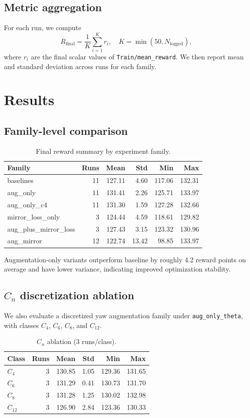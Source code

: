 \documentclass[conference]{IEEEtran}
\begin{document}
\subsection{Metric aggregation}
For each run, we compute
\begin{equation}
R_{\mathrm{final}} = \frac{1}{K}\sum_{i=1}^{K} r_i, \quad K=\min(50, N_{\mathrm{logged}}),
\end{equation}
where $r_i$ are the final scalar values of \texttt{Train/mean\_reward}. We then report mean and standard deviation across runs for each family.

\section{Results}
\subsection{Family-level comparison}
\begin{table}[t]
\caption{Final reward summary by experiment family.}
\label{tab:family}
\centering
\begin{tabular}{lrrrrr}
\toprule
Family & Runs & Mean & Std & Min & Max \\
\midrule
baselines & 11 & 127.11 & 4.60 & 117.06 & 132.31 \\
aug\_only & 11 & 131.41 & 2.26 & 125.71 & 133.97 \\
aug\_only\_c4 & 11 & 131.30 & 1.59 & 127.28 & 132.66 \\
mirror\_loss\_only & 3 & 124.44 & 4.59 & 118.61 & 129.82 \\
aug\_plus\_mirror\_loss & 3 & 127.43 & 3.15 & 123.32 & 130.96 \\
aug\_mirror & 12 & 122.74 & 13.42 & 98.85 & 133.97 \\
\bottomrule
\end{tabular}
\end{table}

Augmentation-only variants outperform baseline by roughly 4.2 reward points on average and have lower variance, indicating improved optimization stability.

\subsection{$C_n$ discretization ablation}
We also evaluate a discretized yaw augmentation family under \texttt{aug\_only\_theta}, with classes $C_4$, $C_6$, $C_8$, and $C_{12}$.

\begin{table}[t]
\caption{$C_n$ ablation (3 runs/class).}
\label{tab:cn}
\centering
\begin{tabular}{lrrrrr}
\toprule
Class & Runs & Mean & Std & Min & Max \\
\midrule
$C_4$ & 3 & 130.85 & 1.05 & 129.36 & 131.65 \\
$C_6$ & 3 & 131.29 & 0.41 & 130.73 & 131.70 \\
$C_8$ & 3 & 131.28 & 1.25 & 130.02 & 132.98 \\
$C_{12}$ & 3 & 126.90 & 2.84 & 123.36 & 130.33 \\
\bottomrule
\end{tabular}
\end{table}
\end{document}
